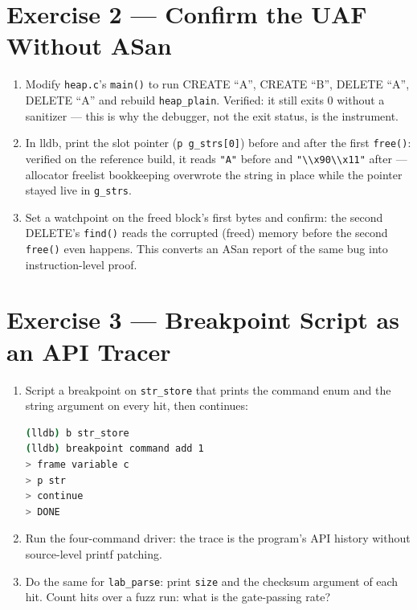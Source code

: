 \documentclass[12pt]{Training}
\begin{document}
\section*{Exercise 2 --- Confirm the UAF Without ASan}
\begin{enumerate}
    \item Modify \lstinline{heap.c}'s \lstinline{main()} to run CREATE ``A'', CREATE ``B'', DELETE ``A'', DELETE ``A'' and rebuild \lstinline{heap_plain}. Verified: it still exits 0 without a sanitizer --- this is why the debugger, not the exit status, is the instrument.
    \item In lldb, print the slot pointer (\lstinline{p g_strs[0]}) before and after the first \lstinline{free()}: verified on the reference build, it reads \lstinline{"A"} before and \lstinline{"\\x90\\x11"} after --- allocator freelist bookkeeping overwrote the string in place while the pointer stayed live in \lstinline{g_strs}.
    \item Set a watchpoint on the freed block's first bytes and confirm: the second DELETE's \lstinline{find()} reads the corrupted (freed) memory before the second \lstinline{free()} even happens. This converts an ASan report of the same bug into instruction-level proof.
\end{enumerate}

\section*{Exercise 3 --- Breakpoint Script as an API Tracer}
\begin{enumerate}
    \item Script a breakpoint on \lstinline{str_store} that prints the command enum and the string argument on every hit, then continues:
    \begin{lstlisting}[language=bash]
(lldb) b str_store
(lldb) breakpoint command add 1
> frame variable c
> p str
> continue
> DONE
    \end{lstlisting}
    \item Run the four-command driver: the trace is the program's API history without source-level printf patching.
    \item Do the same for \lstinline{lab_parse}: print \lstinline{size} and the checksum argument of each hit. Count hits over a fuzz run: what is the gate-passing rate?
\end{enumerate}
\end{document}
